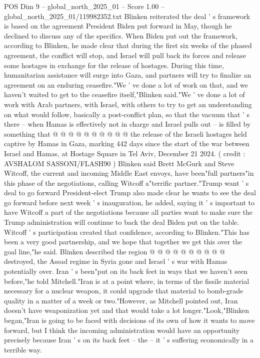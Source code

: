 \begin{textsample}{POS Dim 9 – global\_north\_2025\_01 – Score 1.00 – global\_north\_2025\_01/119982352.txt}  \label{ex:f9_pos_420}
Blinken reiterated the deal ' s framework is based on the agreement President Biden put forward in May, though he declined to discuss any of the specifics.
When Biden put out the framework, according to Blinken, he made clear that during the first six weeks of the phased agreement, the conflict will stop, and Israel will pull back its forces and release some hostages in exchange for the release of hostages.
During this time, humanitarian assistance will surge into Gaza, and partners will try to finalize an agreement on an enduring ceasefire."We ' ve done a lot of work on that, and we haven't waited to get to the ceasefire itself,"Blinken said."We ' ve done a lot of work with Arab partners, with Israel, with others to try to get an understanding on what would follow, basically a post-conflict plan, so that the vacuum that ' s there -- when Hamas is effectively not in charge and Israel pulls out -- is filled by something that @ @ @ @ @ @ @ @ @ @ the release of the Israeli hostages held captive by Hamas in Gaza, marking 442 days since the start of the war between Israel and Hamas, at Hostage Square in Tel Aviv, December 21 2024. ( credit : AVSHALOM SASSONI/FLASH90 ) Blinken said Brett McGurk and Steve Witcoff, the current and incoming Middle East envoys, have been"full partners"in this phase of the negotiations, calling Witcoff a"terrific partner."Trump want ' s deal to go forward President-elect Trump also made clear he wants to see the deal go forward before next week ' s inauguration, he added, saying it ' s important to have Witcoff a part of the negotiations because all parties want to make sure the Trump administration will continue to back the deal Biden put on the table.
Witcoff ' s participation created that confidence, according to Blinken."This has been a very good partnership, and we hope that together we get this over the goal line,"he said.
Blinken described the region @ @ @ @ @ @ @ @ @ @ destroyed, the Assad regime in Syria gone and Israel ' s war with Hamas potentially over.
Iran ' s been"put on its back feet in ways that we haven't seen before,"he told Mitchell."Iran is at a point where, in terms of the fissile material necessary for a nuclear weapon, it could upgrade that material to bomb-grade quality in a matter of a week or two."However, as Mitchell pointed out, Iran doesn't have weaponization yet and that would take a lot longer."Look,"Blinken began,"Iran is going to be faced with decisions of its own of how it wants to move forward, but I think the incoming administration would have an opportunity precisely because Iran ' s on its back feet -- the -- it ' s suffering economically in a terrible way.

\end{textsample}
